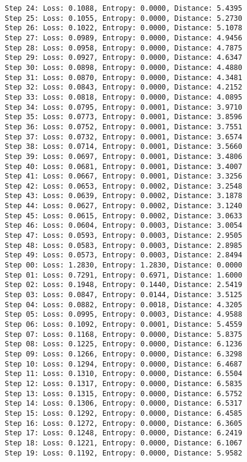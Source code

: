 \documentclass[11pt]{article}
\begin{document}
\begin{Verbatim}[commandchars=\\\{\}]
Step 24: Loss: 0.1088, Entropy: 0.0000, Distance: 5.4395
Step 25: Loss: 0.1055, Entropy: 0.0000, Distance: 5.2730
Step 26: Loss: 0.1022, Entropy: 0.0000, Distance: 5.1078
Step 27: Loss: 0.0989, Entropy: 0.0000, Distance: 4.9456
Step 28: Loss: 0.0958, Entropy: 0.0000, Distance: 4.7875
Step 29: Loss: 0.0927, Entropy: 0.0000, Distance: 4.6347
Step 30: Loss: 0.0898, Entropy: 0.0000, Distance: 4.4880
Step 31: Loss: 0.0870, Entropy: 0.0000, Distance: 4.3481
Step 32: Loss: 0.0843, Entropy: 0.0000, Distance: 4.2152
Step 33: Loss: 0.0818, Entropy: 0.0000, Distance: 4.0895
Step 34: Loss: 0.0795, Entropy: 0.0001, Distance: 3.9710
Step 35: Loss: 0.0773, Entropy: 0.0001, Distance: 3.8596
Step 36: Loss: 0.0752, Entropy: 0.0001, Distance: 3.7551
Step 37: Loss: 0.0732, Entropy: 0.0001, Distance: 3.6574
Step 38: Loss: 0.0714, Entropy: 0.0001, Distance: 3.5660
Step 39: Loss: 0.0697, Entropy: 0.0001, Distance: 3.4806
Step 40: Loss: 0.0681, Entropy: 0.0001, Distance: 3.4007
Step 41: Loss: 0.0667, Entropy: 0.0001, Distance: 3.3256
Step 42: Loss: 0.0653, Entropy: 0.0002, Distance: 3.2548
Step 43: Loss: 0.0639, Entropy: 0.0002, Distance: 3.1878
Step 44: Loss: 0.0627, Entropy: 0.0002, Distance: 3.1240
Step 45: Loss: 0.0615, Entropy: 0.0002, Distance: 3.0633
Step 46: Loss: 0.0604, Entropy: 0.0003, Distance: 3.0054
Step 47: Loss: 0.0593, Entropy: 0.0003, Distance: 2.9505
Step 48: Loss: 0.0583, Entropy: 0.0003, Distance: 2.8985
Step 49: Loss: 0.0573, Entropy: 0.0003, Distance: 2.8494
Step 00: Loss: 1.2830, Entropy: 1.2830, Distance: 0.0000
Step 01: Loss: 0.7291, Entropy: 0.6971, Distance: 1.6000
Step 02: Loss: 0.1948, Entropy: 0.1440, Distance: 2.5419
Step 03: Loss: 0.0847, Entropy: 0.0144, Distance: 3.5125
Step 04: Loss: 0.0882, Entropy: 0.0018, Distance: 4.3205
Step 05: Loss: 0.0995, Entropy: 0.0003, Distance: 4.9588
Step 06: Loss: 0.1092, Entropy: 0.0001, Distance: 5.4559
Step 07: Loss: 0.1168, Entropy: 0.0000, Distance: 5.8375
Step 08: Loss: 0.1225, Entropy: 0.0000, Distance: 6.1236
Step 09: Loss: 0.1266, Entropy: 0.0000, Distance: 6.3298
Step 10: Loss: 0.1294, Entropy: 0.0000, Distance: 6.4687
Step 11: Loss: 0.1310, Entropy: 0.0000, Distance: 6.5504
Step 12: Loss: 0.1317, Entropy: 0.0000, Distance: 6.5835
Step 13: Loss: 0.1315, Entropy: 0.0000, Distance: 6.5752
Step 14: Loss: 0.1306, Entropy: 0.0000, Distance: 6.5317
Step 15: Loss: 0.1292, Entropy: 0.0000, Distance: 6.4585
Step 16: Loss: 0.1272, Entropy: 0.0000, Distance: 6.3605
Step 17: Loss: 0.1248, Entropy: 0.0000, Distance: 6.2419
Step 18: Loss: 0.1221, Entropy: 0.0000, Distance: 6.1067
Step 19: Loss: 0.1192, Entropy: 0.0000, Distance: 5.9582

\end{Verbatim}
\end{document}
